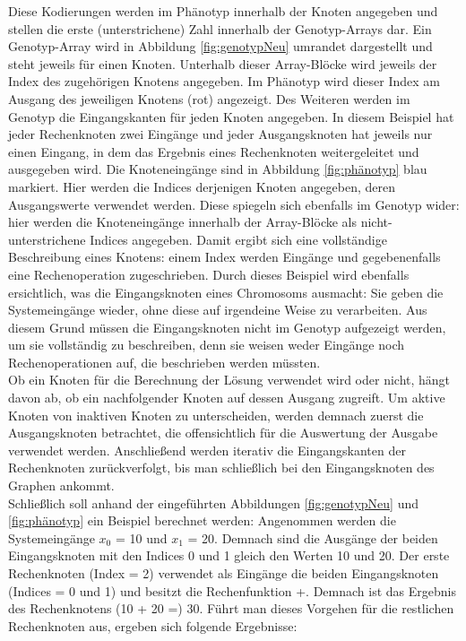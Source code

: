 Diese Kodierungen werden im Phänotyp innerhalb der Knoten angegeben und stellen die erste (unterstrichene) Zahl innerhalb der Genotyp-Arrays dar.
Ein Genotyp-Array wird in Abbildung \ref{fig:genotypNeu} umrandet dargestellt und steht jeweils für einen Knoten.
Unterhalb dieser Array-Blöcke wird jeweils der Index des zugehörigen Knotens angegeben.
Im Phänotyp wird dieser Index am Ausgang des jeweiligen Knotens (rot) angezeigt.\newline
Des Weiteren werden im Genotyp die Eingangskanten für jeden Knoten angegeben. 
In diesem Beispiel hat jeder Rechenknoten zwei Eingänge und jeder Ausgangsknoten hat jeweils nur einen Eingang, in dem das Ergebnis eines Rechenknoten weitergeleitet und ausgegeben wird.
Die Knoteneingänge sind in Abbildung \ref{fig:phänotyp} blau markiert.
Hier werden die Indices derjenigen Knoten angegeben, deren Ausgangswerte verwendet werden.
Diese spiegeln sich ebenfalls im Genotyp wider: hier werden die Knoteneingänge innerhalb der Array-Blöcke als nicht-unterstrichene Indices angegeben.
Damit ergibt sich eine vollständige Beschreibung eines Knotens: einem Index werden Eingänge und gegebenenfalls eine Rechenoperation zugeschrieben.\newline
Durch dieses Beispiel wird ebenfalls ersichtlich, was die Eingangsknoten eines Chromosoms ausmacht:
Sie geben die Systemeingänge wieder, ohne diese auf irgendeine Weise zu verarbeiten.
Aus diesem Grund müssen die Eingangsknoten nicht im Genotyp aufgezeigt werden, um sie vollständig zu beschreiben, denn sie weisen weder Eingänge noch Rechenoperationen auf, die beschrieben werden müssten.\\

Ob ein Knoten für die Berechnung der Lösung verwendet wird oder nicht, hängt davon ab, ob ein nachfolgender Knoten auf dessen Ausgang zugreift.
Um aktive Knoten von inaktiven Knoten zu unterscheiden, werden demnach zuerst die Ausgangsknoten betrachtet, die offensichtlich für die Auswertung der Ausgabe verwendet werden.
Anschließend werden iterativ die Eingangskanten der Rechenknoten zurückverfolgt, bis man schließlich bei den Eingangsknoten des Graphen ankommt.\\

Schließlich soll anhand der eingeführten Abbildungen \ref{fig:genotypNeu} und \ref{fig:phänotyp} ein Beispiel berechnet werden:\newline
Angenommen werden die Systemeingänge $x_0$ = 10 und $x_1$ = 20.
Demnach sind die Ausgänge der beiden Eingangsknoten mit den Indices 0 und 1 gleich den Werten 10 und 20.
Der erste Rechenknoten (Index = 2) verwendet als Eingänge die beiden Eingangsknoten (Indices = 0 und 1) und besitzt die Rechenfunktion +.
Demnach ist das Ergebnis des Rechenknotens (10 + 20 =) 30.
Führt man dieses Vorgehen für die restlichen Rechenknoten aus, ergeben sich folgende Ergebnisse:

